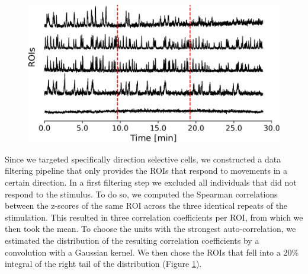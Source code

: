 \vspace{\baselineskip}

\begin{figure}[ht]
    \centering
    \includegraphics[width=0.8\linewidth]{figures/autocorrelation.pdf}
    \label{fig:autocorrelation}
\end{figure}

Since we targeted specifically direction selective cells, we constructed a data filtering pipeline that only provides the ROIs that respond to movements in a certain direction. In a first filtering step we excluded all individuals that did not respond to the stimulus. To do so, we computed the Spearman correlations between the z-scores of the same ROI across the three identical repeats of the stimulation. This resulted in three correlation coefficients per ROI, from which we then took the mean. To choose the units with the strongest auto-correlation, we estimated the distribution of the resulting correlation coefficients by a convolution with a Gaussian kernel. We then chose the ROIs that fell into a 20\% integral of the right tail of the distribution (Figure \ref{fig:autocorrelation}).

